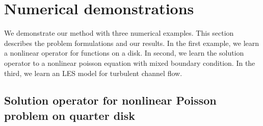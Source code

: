 \section{Numerical demonstrations}

We demonstrate our method with three numerical examples. This section describes the problem formulations and our results. In the first example, we learn a nonlinear operator for functions on a disk. In second, we learn the solution operator to a nonlinear poisson equation with mixed boundary condition. In the third, we learn an LES model for turbulent channel flow.



\subsection{Solution operator for nonlinear Poisson problem on quarter disk}\label{sec:wedge}

